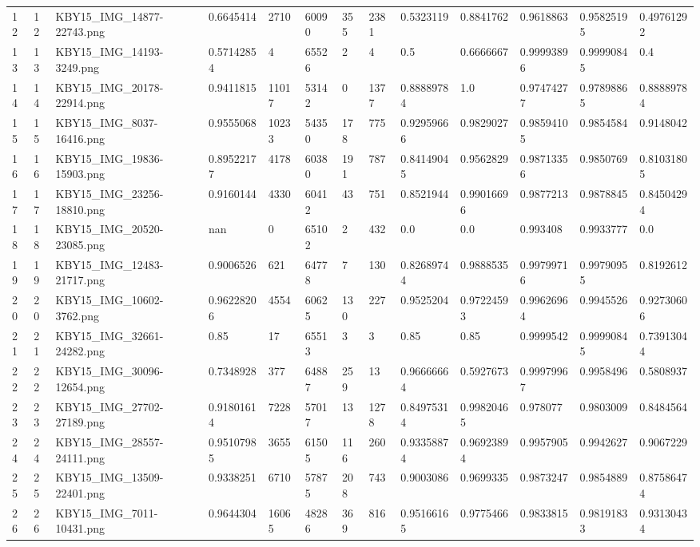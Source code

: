 \documentclass[11pt, a4paper, twoside]{report}
\begin{document}
\begin{longtable}[c]{@{}lllllllllllll@{}}
12 & 12 & KBY15\_IMG\_14877-22743.png & 0.6645414 & 2710 & 60090 & 355 & 2381 & 0.5323119 & 0.8841762 & 0.9618863 & 0.95825195 & 0.49761292 \\
13 & 13 & KBY15\_IMG\_14193-3249.png & 0.57142854 & 4 & 65526 & 2 & 4 & 0.5 & 0.6666667 & 0.99993896 & 0.99990845 & 0.4 \\
14 & 14 & KBY15\_IMG\_20178-22914.png & 0.9411815 & 11017 & 53142 & 0 & 1377 & 0.88889784 & 1.0 & 0.97474277 & 0.97898865 & 0.88889784 \\
15 & 15 & KBY15\_IMG\_8037-16416.png & 0.9555068 & 10233 & 54350 & 178 & 775 & 0.92959666 & 0.9829027 & 0.98594105 & 0.9854584 & 0.9148042 \\
16 & 16 & KBY15\_IMG\_19836-15903.png & 0.89522177 & 4178 & 60380 & 191 & 787 & 0.84149045 & 0.9562829 & 0.98713356 & 0.9850769 & 0.81031805 \\
17 & 17 & KBY15\_IMG\_23256-18810.png & 0.9160144 & 4330 & 60412 & 43 & 751 & 0.8521944 & 0.99016696 & 0.9877213 & 0.9878845 & 0.84504294 \\
18 & 18 & KBY15\_IMG\_20520-23085.png & nan & 0 & 65102 & 2 & 432 & 0.0 & 0.0 & 0.993408 & 0.9933777 & 0.0 \\
19 & 19 & KBY15\_IMG\_12483-21717.png & 0.9006526 & 621 & 64778 & 7 & 130 & 0.82689744 & 0.9888535 & 0.99799716 & 0.99790955 & 0.8192612 \\
20 & 20 & KBY15\_IMG\_10602-3762.png & 0.96228206 & 4554 & 60625 & 130 & 227 & 0.9525204 & 0.97224593 & 0.99626964 & 0.9945526 & 0.92730606 \\
21 & 21 & KBY15\_IMG\_32661-24282.png & 0.85 & 17 & 65513 & 3 & 3 & 0.85 & 0.85 & 0.9999542 & 0.99990845 & 0.73913044 \\
22 & 22 & KBY15\_IMG\_30096-12654.png & 0.7348928 & 377 & 64887 & 259 & 13 & 0.96666664 & 0.5927673 & 0.99979967 & 0.9958496 & 0.5808937 \\
23 & 23 & KBY15\_IMG\_27702-27189.png & 0.91801614 & 7228 & 57017 & 13 & 1278 & 0.84975314 & 0.99820465 & 0.978077 & 0.9803009 & 0.8484564 \\
24 & 24 & KBY15\_IMG\_28557-24111.png & 0.95107985 & 3655 & 61505 & 116 & 260 & 0.93358874 & 0.96923894 & 0.9957905 & 0.9942627 & 0.9067229 \\
25 & 25 & KBY15\_IMG\_13509-22401.png & 0.9338251 & 6710 & 57875 & 208 & 743 & 0.9003086 & 0.9699335 & 0.9873247 & 0.9854889 & 0.87586474 \\
26 & 26 & KBY15\_IMG\_7011-10431.png & 0.9644304 & 16065 & 48286 & 369 & 816 & 0.95166165 & 0.9775466 & 0.9833815 & 0.98191833 & 0.93130434 \\

\end{longtable}
\end{document}
